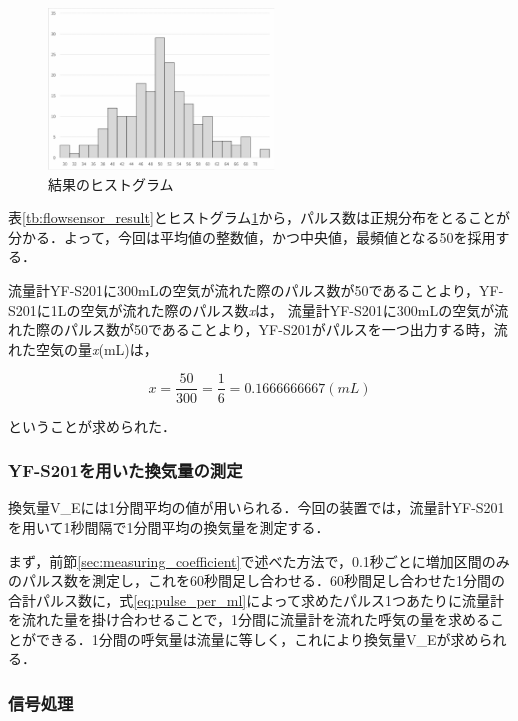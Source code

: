 \begin{figure}[H]
  \begin{center}
    \includegraphics[width=6cm]{fig/flowsensor_histogram}
    \caption{結果のヒストグラム}
    \label{fig:flowsensor_histogram}
  \end{center}
\end{figure}

表\ref{tb:flowsensor_result}とヒストグラム\ref{fig:flowsensor_histogram}から，パルス数は正規分布をとることが分かる．よって，今回は平均値の整数値，かつ中央値，最頻値となる50を採用する．

流量計YF-S201に300mLの空気が流れた際のパルス数が50であることより，YF-S201に1Lの空気が流れた際のパルス数{\it x}は，
流量計YF-S201に300mLの空気が流れた際のパルス数が50であることより，YF-S201がパルスを一つ出力する時，流れた空気の量{\it x}(mL)は，

\begin{equation}
  \label{eq:pulse_per_ml}
  x = \frac{50}{300} = \frac{1}{6} = 0.1666666667 (mL)
\end{equation}

ということが求められた．

\subsubsection{YF-S201を用いた換気量の測定}

換気量V_Eには1分間平均の値が用いられる．今回の装置では，流量計YF-S201を用いて1秒間隔で1分間平均の換気量を測定する．

まず，前節\ref{sec:measuring_coefficient}で述べた方法で，0.1秒ごとに増加区間のみのパルス数を測定し，これを60秒間足し合わせる．60秒間足し合わせた1分間の合計パルス数に，式\ref{eq:pulse_per_ml}によって求めたパルス1つあたりに流量計を流れた量を掛け合わせることで，1分間に流量計を流れた呼気の量を求めることができる．1分間の呼気量は流量に等しく，これにより換気量V_Eが求められる．

\subsubsection{信号処理}

